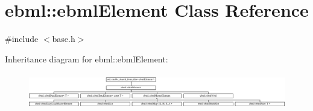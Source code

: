 \hypertarget{classebml_1_1ebmlElement}{}\section{ebml\+:\+:ebml\+Element Class Reference}
\label{classebml_1_1ebmlElement}


{\ttfamily \#include $<$base.\+h$>$}

Inheritance diagram for ebml\+:\+:ebml\+Element\+:\begin{figure}[H]
\begin{center}
\leavevmode
\includegraphics[height=1.611511cm]{classebml_1_1ebmlElement}
\end{center}
\end{figure}
